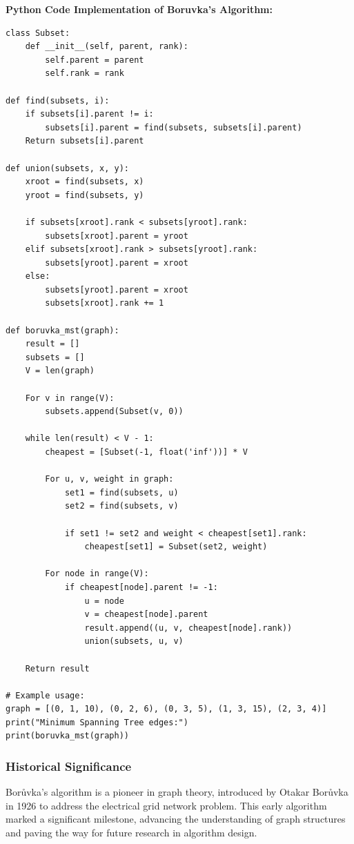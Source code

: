\documentclass[12pt]{book} %
\begin{document}
\FloatBarrier
\textbf{Python Code Implementation of Boruvka's Algorithm:}
\FloatBarrier
\begin{lstlisting}
class Subset:
    def __init__(self, parent, rank):
        self.parent = parent
        self.rank = rank

def find(subsets, i):
    if subsets[i].parent != i:
        subsets[i].parent = find(subsets, subsets[i].parent)
    Return subsets[i].parent

def union(subsets, x, y):
    xroot = find(subsets, x)
    yroot = find(subsets, y)

    if subsets[xroot].rank < subsets[yroot].rank:
        subsets[xroot].parent = yroot
    elif subsets[xroot].rank > subsets[yroot].rank:
        subsets[yroot].parent = xroot
    else:
        subsets[yroot].parent = xroot
        subsets[xroot].rank += 1

def boruvka_mst(graph):
    result = []
    subsets = []
    V = len(graph)
    
    For v in range(V):
        subsets.append(Subset(v, 0))

    while len(result) < V - 1:
        cheapest = [Subset(-1, float('inf'))] * V

        For u, v, weight in graph:
            set1 = find(subsets, u)
            set2 = find(subsets, v)

            if set1 != set2 and weight < cheapest[set1].rank:
                cheapest[set1] = Subset(set2, weight)

        For node in range(V):
            if cheapest[node].parent != -1:
                u = node
                v = cheapest[node].parent
                result.append((u, v, cheapest[node].rank))
                union(subsets, u, v)

    Return result

# Example usage:
graph = [(0, 1, 10), (0, 2, 6), (0, 3, 5), (1, 3, 15), (2, 3, 4)]
print("Minimum Spanning Tree edges:")
print(boruvka_mst(graph))
\end{lstlisting}
\subsubsection{Historical Significance}

Borůvka's algorithm is a pioneer in graph theory, introduced by Otakar Borůvka in 1926 to address the electrical grid network problem. This early algorithm marked a significant milestone, advancing the understanding of graph structures and paving the way for future research in algorithm design. 
\end{document}
